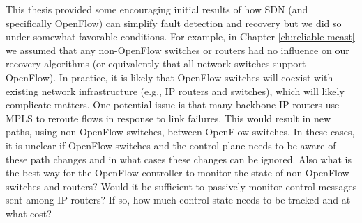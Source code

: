 This thesis provided some encouraging initial results of how SDN (and specifically OpenFlow) can simplify fault detection and recovery but we did so under somewhat favorable conditions.  For example,
in Chapter \ref{ch:reliable-mcast} we assumed that any non-OpenFlow switches or routers had no influence on our recovery algorithms (or equivalently that all network switches support OpenFlow). 
In practice, it is likely that OpenFlow switches will coexist with existing network infrastructure (e.g., IP routers and switches), which will likely complicate matters.  One potential
issue is that many backbone IP routers use MPLS to reroute flows in response to link failures.  This would result in new paths, using non-OpenFlow switches, between OpenFlow switches. 
In these cases, it is unclear if OpenFlow switches and the control plane needs to be aware of these path changes and in what cases these changes can be ignored. 
Also what is the best way for the OpenFlow controller to monitor the state of non-OpenFlow switches and routers? 
Would it be sufficient to passively monitor control messages sent among IP routers?  If so, how much control state needs to be tracked and at what cost? 
